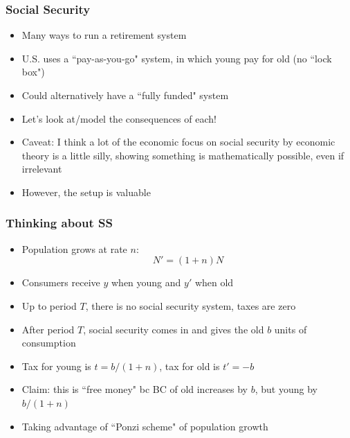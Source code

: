 \documentclass{beamer}
\begin{document}
\begin{frame}
\frametitle[alignment=center]{Social Security}
\begin{itemize}
\item Many ways to run a retirement system
\bigskip
\item U.S. uses a ``pay-as-you-go" system, in which young pay for old (no ``lock box")
\bigskip
\item Could alternatively have a ``fully funded" system
\bigskip
\item Let's look at/model the consequences of each!
\bigskip
\item Caveat:  I think a lot of the economic focus on social security by economic theory is a little silly, showing something is mathematically possible, even if irrelevant
\bigskip
\item However, the setup is valuable
\end{itemize}
 \end{frame}

\begin{frame}
\frametitle[alignment=center]{Thinking about SS}
\begin{itemize}
\item Population grows at rate $n$:
$$N'=(1+n)N$$
\item Consumers receive $y$ when young and $y'$ when old
\bigskip
\item Up to period $T$, there is no social security system, taxes are zero
\bigskip
\item After period $T$, social security comes in and gives the old $b$ units of consumption
\bigskip
\item Tax for young is $t=b/(1+n)$, tax for old is $t'=-b$
\bigskip
\item Claim: this is ``free money" bc BC of old increases by $b$, but young by $b/(1+n)$
\bigskip
\item Taking advantage of ``Ponzi scheme" of population growth
\end{itemize}
 \end{frame}
\end{document}
